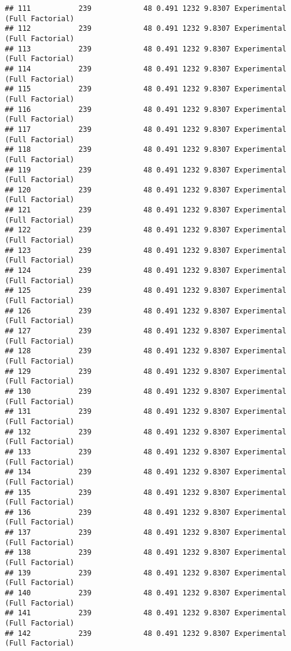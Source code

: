 \documentclass[]{article}
\begin{document}
\begin{verbatim}
## 111           239            48 0.491 1232 9.8307 Experimental (Full Factorial)
## 112           239            48 0.491 1232 9.8307 Experimental (Full Factorial)
## 113           239            48 0.491 1232 9.8307 Experimental (Full Factorial)
## 114           239            48 0.491 1232 9.8307 Experimental (Full Factorial)
## 115           239            48 0.491 1232 9.8307 Experimental (Full Factorial)
## 116           239            48 0.491 1232 9.8307 Experimental (Full Factorial)
## 117           239            48 0.491 1232 9.8307 Experimental (Full Factorial)
## 118           239            48 0.491 1232 9.8307 Experimental (Full Factorial)
## 119           239            48 0.491 1232 9.8307 Experimental (Full Factorial)
## 120           239            48 0.491 1232 9.8307 Experimental (Full Factorial)
## 121           239            48 0.491 1232 9.8307 Experimental (Full Factorial)
## 122           239            48 0.491 1232 9.8307 Experimental (Full Factorial)
## 123           239            48 0.491 1232 9.8307 Experimental (Full Factorial)
## 124           239            48 0.491 1232 9.8307 Experimental (Full Factorial)
## 125           239            48 0.491 1232 9.8307 Experimental (Full Factorial)
## 126           239            48 0.491 1232 9.8307 Experimental (Full Factorial)
## 127           239            48 0.491 1232 9.8307 Experimental (Full Factorial)
## 128           239            48 0.491 1232 9.8307 Experimental (Full Factorial)
## 129           239            48 0.491 1232 9.8307 Experimental (Full Factorial)
## 130           239            48 0.491 1232 9.8307 Experimental (Full Factorial)
## 131           239            48 0.491 1232 9.8307 Experimental (Full Factorial)
## 132           239            48 0.491 1232 9.8307 Experimental (Full Factorial)
## 133           239            48 0.491 1232 9.8307 Experimental (Full Factorial)
## 134           239            48 0.491 1232 9.8307 Experimental (Full Factorial)
## 135           239            48 0.491 1232 9.8307 Experimental (Full Factorial)
## 136           239            48 0.491 1232 9.8307 Experimental (Full Factorial)
## 137           239            48 0.491 1232 9.8307 Experimental (Full Factorial)
## 138           239            48 0.491 1232 9.8307 Experimental (Full Factorial)
## 139           239            48 0.491 1232 9.8307 Experimental (Full Factorial)
## 140           239            48 0.491 1232 9.8307 Experimental (Full Factorial)
## 141           239            48 0.491 1232 9.8307 Experimental (Full Factorial)
## 142           239            48 0.491 1232 9.8307 Experimental (Full Factorial)

\end{verbatim}
\end{document}
